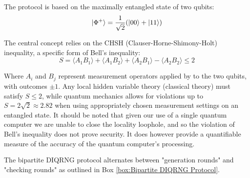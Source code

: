 \documentclass[lettersize,journal]{IEEEtran}
\begin{document}
The protocol is based on the maximally entangled state of two qubits:
\begin{equation}
    \ket{\Phi^+} = \frac{1}{\sqrt{2}}(\ket{00} + \ket{11})
    \label{eq:bell_state}
\end{equation}

The central concept relies on the CHSH (Clauser-Horne-Shimony-Holt) inequality, a specific form of Bell's inequality:
\begin{equation}
    S = \langle A_1 B_1 \rangle + \langle A_1 B_2 \rangle + \langle A_2 B_1 \rangle - \langle A_2 B_2 \rangle \leq 2
    \label{eq:chsh}
\end{equation}

Where $A_i$ and $B_j$ represent measurement operators applied by to the two qubits, with outcomes $\pm 1$. Any local hidden variable theory (classical theory) must satisfy $S \leq 2$, while quantum mechanics allows for violations up to $S = 2\sqrt{2} \approx 2.82$ when using appropriately chosen measurement settings on an entangled state. It should be noted that given our use of a single quantum computer we are unable to close the locality loophole, and so the violation of Bell's inequality does not prove security. It does however provide a quantifiable measure of the accuracy of the quantum computer's processing.

The bipartite DIQRNG protocol alternates between "generation rounds" and "checking rounds" as outlined in Box \ref{box:Bipartite DIQRNG Protocol}.
\end{document}
